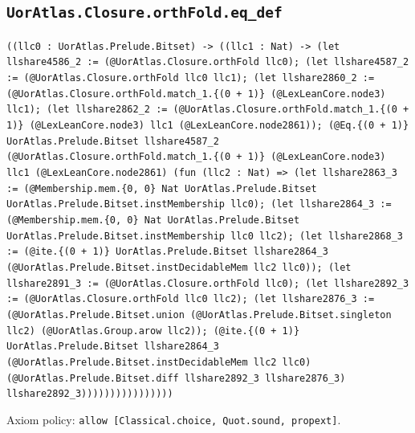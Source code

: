 \documentclass[11pt]{article}
\begin{document}
\subsection*{\texttt{UorAtlas.Closure.orthFold.eq\_def}}
\noindent\texttt{((llc0 : UorAtlas.Prelude.Bitset) -> ((llc1 : Nat) -> (let llshare4586\_2 := (@UorAtlas.Closure.orthFold llc0); (let llshare4587\_2 := (@UorAtlas.Closure.orthFold llc0 llc1); (let llshare2860\_2 := (@UorAtlas.Closure.orthFold.match\_1.\{(0 + 1)\} (@LexLeanCore.node3) llc1); (let llshare2862\_2 := (@UorAtlas.Closure.orthFold.match\_1.\{(0 + 1)\} (@LexLeanCore.node3) llc1 (@LexLeanCore.node2861)); (@Eq.\{(0 + 1)\} UorAtlas.Prelude.Bitset llshare4587\_2 (@UorAtlas.Closure.orthFold.match\_1.\{(0 + 1)\} (@LexLeanCore.node3) llc1 (@LexLeanCore.node2861) (fun (llc2 : Nat) => (let llshare2863\_3 := (@Membership.mem.\{0, 0\} Nat UorAtlas.Prelude.Bitset UorAtlas.Prelude.Bitset.instMembership llc0); (let llshare2864\_3 := (@Membership.mem.\{0, 0\} Nat UorAtlas.Prelude.Bitset UorAtlas.Prelude.Bitset.instMembership llc0 llc2); (let llshare2868\_3 := (@ite.\{(0 + 1)\} UorAtlas.Prelude.Bitset llshare2864\_3 (@UorAtlas.Prelude.Bitset.instDecidableMem llc2 llc0)); (let llshare2891\_3 := (@UorAtlas.Closure.orthFold llc0); (let llshare2892\_3 := (@UorAtlas.Closure.orthFold llc0 llc2); (let llshare2876\_3 := (@UorAtlas.Prelude.Bitset.union (@UorAtlas.Prelude.Bitset.singleton llc2) (@UorAtlas.Group.arow llc2)); (@ite.\{(0 + 1)\} UorAtlas.Prelude.Bitset llshare2864\_3 (@UorAtlas.Prelude.Bitset.instDecidableMem llc2 llc0) (@UorAtlas.Prelude.Bitset.diff llshare2892\_3 llshare2876\_3) llshare2892\_3))))))))))))))))}\par
\noindent Axiom policy: \texttt{allow [Classical.choice, Quot.sound, propext]}.\par
\end{document}
